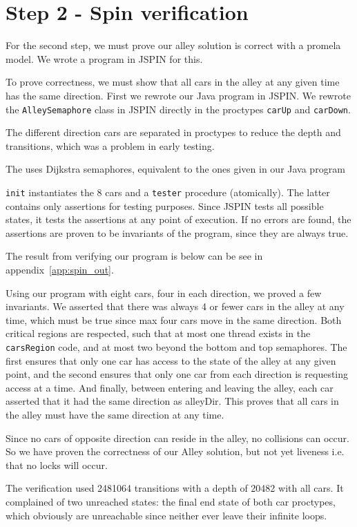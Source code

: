 \section{Step 2 - Spin verification}
For the second step, we must prove our alley solution is correct with a promela model. We wrote a program in JSPIN for this.

To prove correctness, we must show that all cars in the alley at any given time has the same direction. First we rewrote our Java program in JSPIN. We rewrote the \texttt{AlleySemaphore} class in JSPIN directly in the proctypes \texttt{carUp} and \texttt{carDown}.

The different direction cars are separated in proctypes to reduce the depth and transitions, which was a problem in early testing.

The uses Dijkstra semaphores, equivalent to the ones given in our Java program

\texttt{init} instantiates the 8 cars and a \texttt{tester} procedure (atomically). The latter contains only assertions for testing purposes. Since JSPIN tests all possible states, it tests the assertions at any point of execution. If no errors are found, the assertions are proven to be invariants of the program, since they are always true.

The result from verifying our program is below can be see in appendix~\ref{app:spin_out}.

Using our program with eight cars, four in each direction, we proved a few invariants. We asserted that there was always 4 or fewer cars in the alley at any time, which must be true since max four cars move in the same direction. Both critical regions are respected, such that at most one thread exists in the \texttt{carsRegion} code, and at most two beyond the bottom and top semaphores. The first ensures that only one car has access to the state of the alley at any given point, and the second ensures that only one car from each direction is requesting access at a time. And finally, between entering and leaving the alley, each car asserted that it had the same direction as alleyDir. This proves that all cars in the alley must have the same direction at any time.

Since no cars of opposite direction can reside in the alley, no collisions can occur. So we have proven the correctness of our Alley solution, but not yet liveness i.e. that no locks will occur.

The verification used 2481064 transitions with a depth of 20482 with all cars. It complained of two unreached states: the final end state of both car proctypes, which obviously are unreachable since neither ever leave their infinite loops.